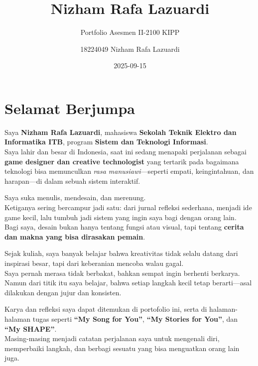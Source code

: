 \documentclass[
  letterpaper,
  DIV=11,
  numbers=noendperiod]{scrreprt}
\title{Nizham Rafa Lazuardi}
\subtitle{Portfolio Asesmen II-2100 KIPP}
\author{18224049 Nizham Rafa Lazuardi}
\date{2025-09-15}
\renewcommand*\contentsname{Table of contents}
\newcommand\contentsname{Table of contents}
\begin{document}
\maketitle

\renewcommand*\contentsname{Table of contents}
{
\hypersetup{linkcolor=}
\setcounter{tocdepth}{2}
\tableofcontents
}


\chapter*{Selamat Berjumpa}\label{selamat-berjumpa}


Saya \textbf{Nizham Rafa Lazuardi}, mahasiswa \textbf{Sekolah Teknik
Elektro dan Informatika ITB}, program \textbf{Sistem dan Teknologi
Informasi}.\\
Saya lahir dan besar di Indonesia, saat ini sedang menapaki perjalanan
sebagai \textbf{game designer dan creative technologist} yang tertarik
pada bagaimana teknologi bisa memunculkan \emph{rasa
manusiawi}---seperti empati, keingintahuan, dan harapan---di dalam
sebuah sistem interaktif.

Saya suka menulis, mendesain, dan merenung.\\
Ketiganya sering bercampur jadi satu: dari jurnal refleksi sederhana,
menjadi ide game kecil, lalu tumbuh jadi sistem yang ingin saya bagi
dengan orang lain.\\
Bagi saya, desain bukan hanya tentang fungsi atau visual, tapi tentang
\textbf{cerita dan makna yang bisa dirasakan pemain}.

Sejak kuliah, saya banyak belajar bahwa kreativitas tidak selalu datang
dari inspirasi besar, tapi dari keberanian mencoba walau gagal.\\
Saya pernah merasa tidak berbakat, bahkan sempat ingin berhenti
berkarya.\\
Namun dari titik itu saya belajar, bahwa setiap langkah kecil tetap
berarti---asal dilakukan dengan jujur dan konsisten.

Karya dan refleksi saya dapat ditemukan di portofolio ini, serta di
halaman-halaman tugas seperti \textbf{``My Song for You''}, \textbf{``My
Stories for You''}, dan \textbf{``My SHAPE''}.\\
Masing-masing menjadi catatan perjalanan saya untuk mengenali diri,
memperbaiki langkah, dan berbagi sesuatu yang bisa menguatkan orang lain
juga.
\end{document}
